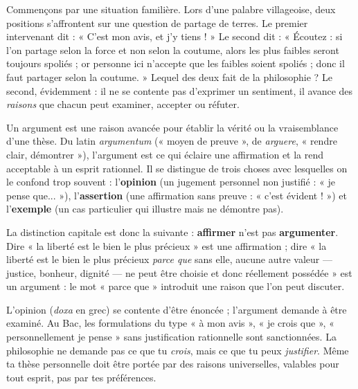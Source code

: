 \documentclass[11pt]{article}
\newcommand{\cle}[1]{{\popxbold\color{popdark}#1}}
\newcounter{popsec}
\newcounter{popsub}
\newcommand{\courssub}[1]{%
  \stepcounter{popsub}%
  \par\vspace{9pt}\noindent{\popxbold\fontsize{11.5}{13}\selectfont\color{popink}{\color{poporange}\thepopsec.\thepopsub}\hspace{6pt}#1}\par\nopagebreak\vspace{4pt}
}
\begin{document}
Commençons par une situation familière. Lors d'une palabre villageoise, deux positions s'affrontent sur une question de partage de terres. Le premier intervenant dit : « C'est mon avis, et j'y tiens ! » Le second dit : « Écoutez : si l'on partage selon la force et non selon la coutume, alors les plus faibles seront toujours spoliés ; or personne ici n'accepte que les faibles soient spoliés ; donc il faut partager selon la coutume. » Lequel des deux fait de la philosophie ? Le second, évidemment : il ne se contente pas d'exprimer un sentiment, il avance des \emph{raisons} que chacun peut examiner, accepter ou réfuter.

\begin{definition}
Un \cle{argument} est une raison avancée pour établir la vérité ou la vraisemblance d'une thèse. Du latin \emph{argumentum} (« moyen de preuve », de \emph{arguere}, « rendre clair, démontrer »), l'argument est ce qui éclaire une affirmation et la rend acceptable à un esprit rationnel. Il se distingue de trois choses avec lesquelles on le confond trop souvent : l'\textbf{opinion} (un jugement personnel non justifié : « je pense que... »), l'\textbf{assertion} (une affirmation sans preuve : « c'est évident ! ») et l'\textbf{exemple} (un cas particulier qui illustre mais ne démontre pas).
\end{definition}

La distinction capitale est donc la suivante : \textbf{affirmer} n'est pas \textbf{argumenter}. Dire « la liberté est le bien le plus précieux » est une affirmation ; dire « la liberté est le bien le plus précieux \emph{parce que} sans elle, aucune autre valeur — justice, bonheur, dignité — ne peut être choisie et donc réellement possédée » est un argument : le mot « parce que » introduit une raison que l'on peut discuter.

\begin{attention}
L'opinion (\emph{doxa} en grec) se contente d'être énoncée ; l'argument demande à être examiné. Au Bac, les formulations du type « à mon avis », « je crois que », « personnellement je pense » sans justification rationnelle sont sanctionnées. La philosophie ne demande pas ce que tu \emph{crois}, mais ce que tu peux \emph{justifier}. Même ta thèse personnelle doit être portée par des raisons universelles, valables pour tout esprit, pas par tes préférences.
\end{attention}

\courssub{Les principaux types d'arguments}\par
\end{document}
